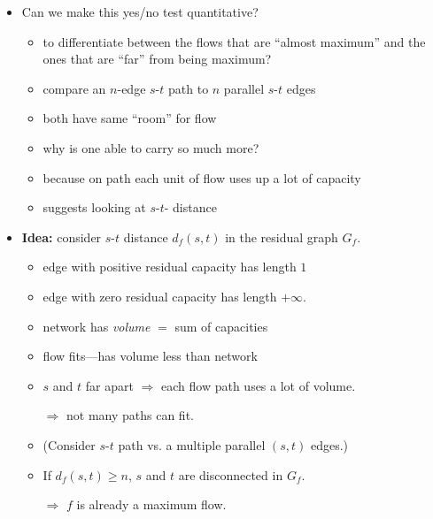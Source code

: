 \documentclass{article}
\begin{document}
\begin{itemize}
\begin{itemize}
  \item Can we make this yes/no test quantitative?
    \begin{itemize}
    \item to differentiate between the flows that are ``almost maximum'' and the ones that are ``far'' from being maximum?
    \item compare an $n$-edge $s$-$t$ path to $n$ parallel $s$-$t$ edges
    \item both have same ``room'' for flow
    \item why is one able to carry so much more?
    \item because on path each unit of flow uses up a lot of capacity
    \item suggests looking at $s$-$t$- distance
    \end{itemize}



  \item \textbf{Idea:} consider $s$-$t$ distance $d_f(s,t)$ in the residual graph $G_f$.
    \begin{itemize}
    \item edge with positive residual capacity has length $1$
    \item edge with zero residual capacity has length $+\infty$.
    \item network has \emph{volume} $=$ sum of capacities
    \item flow fits---has volume less than network
    \item $s$ and $t$ far apart $\Rightarrow$ each flow path uses a lot of volume.
      
    $\Rightarrow$ not many paths can fit.
    \item (Consider $s$-$t$ path vs. a multiple parallel $(s,t)$ edges.)
    \item  If $d_f(s,t)\geq n$, $s$ and $t$ are disconnected in $G_f$.

      $\Rightarrow$ $f$ is already a maximum flow. 
    \end{itemize}
  \end{itemize}
\end{itemize}
\end{document}
